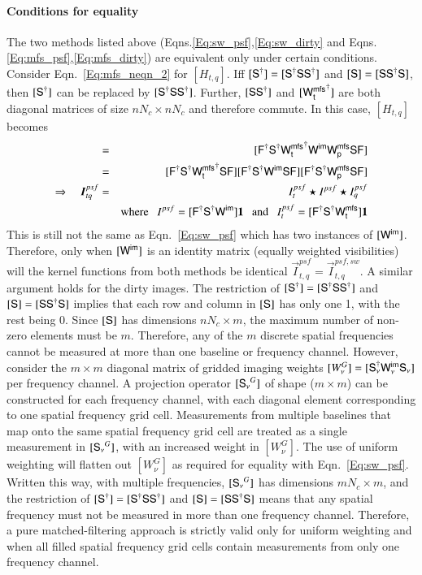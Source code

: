 \documentclass[structabstract]{stylefiles/aa}
\newcommand{\F}{{\tens{F}}}
\newcommand{\Fd}{{\tens{F^\dag}}}
\newcommand{\Sa}{{\tens{S}}}
\newcommand{\Sd}{{\tens{S^\dag}}}
\newcommand{\Sna}{\tens{{S_{\nu}}}}
\newcommand{\Snd}{\tens{{S_{\nu}^\dag}}}
\newcommand{\Wim}{{\tens{W^{im}}}}
\newcommand{\Wnt}{{\tens{W^{mfs}_t}}}
\newcommand{\Wntd}{{\tens{{W^{mfs}_t}^\dag}}}
\newcommand{\Wnp}{{\tens{W^{mfs}_p}}}
\newcommand{\Wimn}{{\tens{W^{im}_{\nu}}}}
\begin{document}
\begin{appendix}
\paragraph{Conditions for equality}
The two methods listed above (Eqns.\ref{Eq:sw_psf},\ref{Eq:sw_dirty} and
Eqns.\ref{Eq:mfs_psf},\ref{Eq:mfs_dirty})
are equivalent only under certain conditions.
Consider Eqn.~\ref{Eq:mfs_neqn_2} for $[H_{t,q}]$. Iff $[\Sd] = [\Sd\Sa\Sd]$ and $[\Sa] = [\Sa\Sd\Sa]$, 
then $[\Sd]$ can be
replaced by $[\Sd\Sa\Sd]$. Further, $[\Sa\Sd]$ and $[\Wntd]$ are both diagonal
matrices of size $nN_c\times nN_c$ and therefore commute.
In this case, $[H_{t,q}]$ becomes
\begin{eqnarray}
[H_{t,q}] &=& [\Fd\Sd\Wntd\Wim\Wnp\Sa\F]\\
	  &=& [\Fd\Sd\Wntd\Sa\F][\Fd\Sd\Wim\Sa\F] [\Fd\Sd\Wnp\Sa\F]\nonumber\\
\Rightarrow~~~~ \vec{I}^{psf}_{tq} &=& I^{psf}_t \star I^{psf} \star I^{psf}_q\\ 
& & \mathrm{where}~~~ I^{psf} = [\Fd\Sd\Wim]\vec{1} ~~~\mathrm{and}~~~ 
I^{psf}_t = [\Fd\Sd\Wnt]\vec{1} \nonumber
\end{eqnarray}
This is still not the same as Eqn.~\ref{Eq:sw_psf} which has two instances of $[\Wim]$.
Therefore, only when $[\Wim]$ is an identity matrix (equally weighted visibilities)
will the kernel functions  from both methods be identical 
$\vec{I}^{psf}_{t,q} = \vec{I}^{psf,sw}_{t,q}$.
A similar argument holds for the dirty images.
%
The restriction of $[\Sd] = [\Sd\Sa\Sd]$ and $[\Sa] = [\Sa\Sd\Sa]$ implies that 
each row and column in $[\Sa]$ has only one 1, with the rest being 0. Since $[\Sa]$ has dimensions
$nN_c\times m$, the maximum number of non-zero elements must be $m$.  
Therefore, any of the $m$ discrete spatial frequencies cannot be measured at more than one
baseline or frequency channel.  
However, consider the $m\times m$ diagonal matrix of gridded imaging weights
$[W^G_{\nu}] = [\Snd\Wimn\Sna]$ per frequency channel.
A projection operator $[\Sna^G]$ of shape ($m\times m$) can be constructed for each frequency
channel, with each diagonal element corresponding to one spatial frequency grid cell.
Measurements from multiple baselines that map onto the same spatial frequency grid cell are
treated as a single measurement in $[\Sna^G]$, with an increased weight in $[W^G_{\nu}]$.  
The use of uniform weighting will flatten out $[W^G_{\nu}]$ as required for equality with
Eqn.~\ref{Eq:sw_psf}. 
Written this way, with multiple frequencies, $[\Sna^G]$ has dimensions $mN_c \times m$, 
and the restriction of $[\Sd] = [\Sd\Sa\Sd]$ and $[\Sa] = [\Sa\Sd\Sa]$ means that any spatial 
frequency must not be measured in more than one frequency channel.
Therefore, a pure matched-filtering approach is strictly valid only for uniform 
weighting and when all filled spatial frequency grid cells contain 
measurements from only one frequency channel.

\end{appendix}
\end{document}
